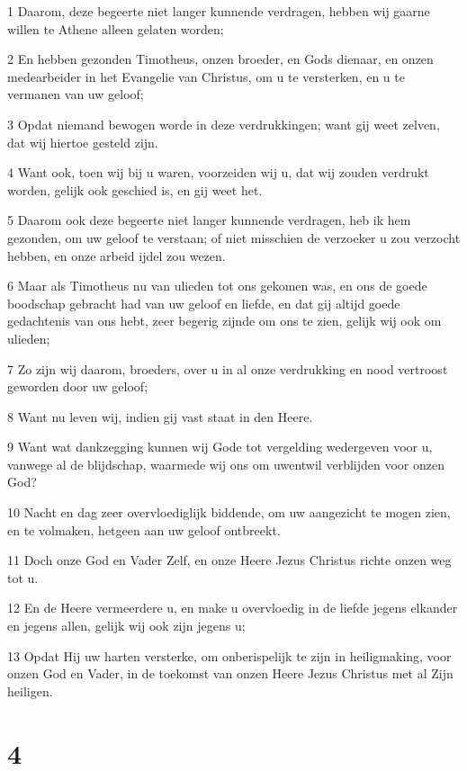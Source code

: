 \par 1 Daarom, deze begeerte niet langer kunnende verdragen, hebben wij gaarne willen te Athene alleen gelaten worden;
\par 2 En hebben gezonden Timotheus, onzen broeder, en Gods dienaar, en onzen medearbeider in het Evangelie van Christus, om u te versterken, en u te vermanen van uw geloof;
\par 3 Opdat niemand bewogen worde in deze verdrukkingen; want gij weet zelven, dat wij hiertoe gesteld zijn.
\par 4 Want ook, toen wij bij u waren, voorzeiden wij u, dat wij zouden verdrukt worden, gelijk ook geschied is, en gij weet het.
\par 5 Daarom ook deze begeerte niet langer kunnende verdragen, heb ik hem gezonden, om uw geloof te verstaan; of niet misschien de verzoeker u zou verzocht hebben, en onze arbeid ijdel zou wezen.
\par 6 Maar als Timotheus nu van ulieden tot ons gekomen was, en ons de goede boodschap gebracht had van uw geloof en liefde, en dat gij altijd goede gedachtenis van ons hebt, zeer begerig zijnde om ons te zien, gelijk wij ook om ulieden;
\par 7 Zo zijn wij daarom, broeders, over u in al onze verdrukking en nood vertroost geworden door uw geloof;
\par 8 Want nu leven wij, indien gij vast staat in den Heere.
\par 9 Want wat dankzegging kunnen wij Gode tot vergelding wedergeven voor u, vanwege al de blijdschap, waarmede wij ons om uwentwil verblijden voor onzen God?
\par 10 Nacht en dag zeer overvloediglijk biddende, om uw aangezicht te mogen zien, en te volmaken, hetgeen aan uw geloof ontbreekt.
\par 11 Doch onze God en Vader Zelf, en onze Heere Jezus Christus richte onzen weg tot u.
\par 12 En de Heere vermeerdere u, en make u overvloedig in de liefde jegens elkander en jegens allen, gelijk wij ook zijn jegens u;
\par 13 Opdat Hij uw harten versterke, om onberispelijk te zijn in heiligmaking, voor onzen God en Vader, in de toekomst van onzen Heere Jezus Christus met al Zijn heiligen.

\chapter{4}

